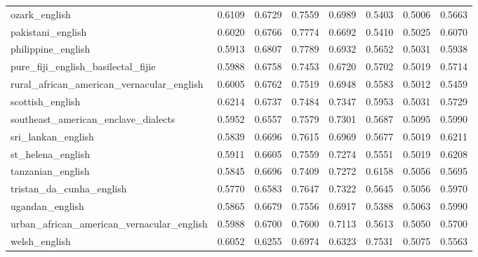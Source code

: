 \begin{landscape}
\begin{longtable}{lccccccc}
ozark\_english & 0.6109 & 0.6729 & 0.7559 & 0.6989 & 0.5403 & 0.5006 & 0.5663 \\
pakistani\_english & 0.6020 & 0.6766 & 0.7774 & 0.6692 & 0.5410 & 0.5025 & 0.6070 \\
philippine\_english & 0.5913 & 0.6807 & 0.7789 & 0.6932 & 0.5652 & 0.5031 & 0.5938 \\
pure\_fiji\_english\_basilectal\_fijie & 0.5988 & 0.6758 & 0.7453 & 0.6720 & 0.5702 & 0.5019 & 0.5714 \\
rural\_african\_american\_vernacular\_english & 0.6005 & 0.6762 & 0.7519 & 0.6948 & 0.5583 & 0.5012 & 0.5459 \\
scottish\_english & 0.6214 & 0.6737 & 0.7484 & 0.7347 & 0.5953 & 0.5031 & 0.5729 \\
southeast\_american\_enclave\_dialects & 0.5952 & 0.6557 & 0.7579 & 0.7301 & 0.5687 & 0.5095 & 0.5990 \\
sri\_lankan\_english & 0.5839 & 0.6696 & 0.7615 & 0.6969 & 0.5677 & 0.5019 & 0.6211 \\
st\_helena\_english & 0.5911 & 0.6605 & 0.7559 & 0.7274 & 0.5551 & 0.5019 & 0.6208 \\
tanzanian\_english & 0.5845 & 0.6696 & 0.7409 & 0.7272 & 0.6158 & 0.5056 & 0.5695 \\
tristan\_da\_cunha\_english & 0.5770 & 0.6583 & 0.7647 & 0.7322 & 0.5645 & 0.5056 & 0.5970 \\
ugandan\_english & 0.5865 & 0.6679 & 0.7556 & 0.6917 & 0.5388 & 0.5063 & 0.5990 \\
urban\_african\_american\_vernacular\_english & 0.5988 & 0.6700 & 0.7600 & 0.7113 & 0.5613 & 0.5050 & 0.5700 \\
welsh\_english & 0.6052 & 0.6255 & 0.6974 & 0.6323 & 0.7531 & 0.5075 & 0.5563 \\
\bottomrule
\end{longtable}
\end{landscape}